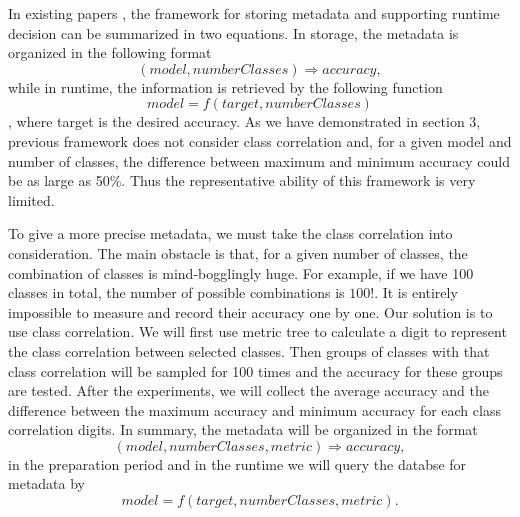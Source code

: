 \documentclass[conference]{IEEEtran}
\begin{document}
\begin{spacing}{0.9}
In existing papers \cite{han2016mcdnn, shen2016fast, kang2017noscope}, the framework for storing metadata and supporting runtime decision can be summarized in two equations. In storage, the metadata is organized in the following format 
\begin{equation}
    (model, numberClasses) \Longrightarrow accuracy,
\end{equation}
while in runtime, the information is retrieved by the following function
\begin{equation}
    model = f(target, numberClasses)
\end{equation}
, where target is the desired accuracy. As we have demonstrated in section 3, previous framework does not consider class correlation and, for a given model and number of classes, the difference between maximum and minimum accuracy could be as large as 50\%. Thus the representative ability of this framework is very limited. 

To give a more precise metadata, we must take the class correlation into consideration. The main obstacle is that, for a given number of classes, the combination of classes is mind-bogglingly huge. For example, if we have 100 classes in total, the number of possible combinations is $100!$. It is entirely impossible to measure and record their accuracy one by one. Our solution is to use class correlation. We will first use metric tree to calculate a digit to represent the class correlation between selected classes. Then groups of classes with that class correlation will be sampled for 100 times and the accuracy for these groups are tested. After the experiments, we will collect the average accuracy and the difference between the maximum accuracy and minimum accuracy for each class correlation digits. In summary, the metadata will be organized in the format
\begin{equation}
    (model, numberClasses, metric) \Longrightarrow accuracy,
\end{equation}
in the preparation period and in the runtime we will query the databse for metadata by
\begin{equation}
    model = f(target, numberClasses, metric).
\end{equation}


\end{spacing}
\end{document}

